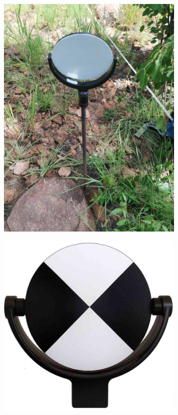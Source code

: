 \documentclass[11pt,a4paper]{article}
\begin{document}
\begin{figure}
	\begin{subfigure}{0.45\linewidth}
		\includegraphics[width=\linewidth]{target_situ}
		\caption{}
		\label{target_situ}
	\end{subfigure}
	\hfill
	\begin{subfigure}{0.45\linewidth}
		\includegraphics[width=\linewidth]{target_face}

\end{subfigure}
\end{figure}
\end{document}
